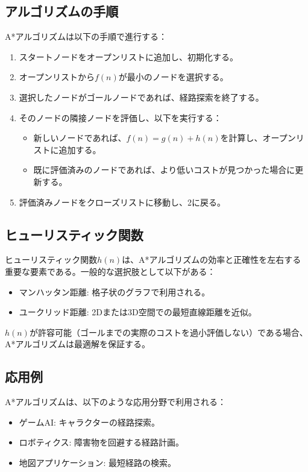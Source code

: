 \subsection*{アルゴリズムの手順}
A*アルゴリズムは以下の手順で進行する：
\begin{enumerate}
    \item スタートノードをオープンリストに追加し、初期化する。
    \item オープンリストから$f(n)$が最小のノードを選択する。
    \item 選択したノードがゴールノードであれば、経路探索を終了する。
    \item そのノードの隣接ノードを評価し、以下を実行する：
    \begin{itemize}
        \item 新しいノードであれば、$f(n) = g(n) + h(n)$を計算し、オープンリストに追加する。
        \item 既に評価済みのノードであれば、より低いコストが見つかった場合に更新する。
    \end{itemize}
    \item 評価済みノードをクローズリストに移動し、2に戻る。
\end{enumerate}

\subsection*{ヒューリスティック関数}
ヒューリスティック関数$h(n)$は、A*アルゴリズムの効率と正確性を左右する重要な要素である。一般的な選択肢として以下がある：
\begin{itemize}
    \item マンハッタン距離: 格子状のグラフで利用される。
    \item ユークリッド距離: 2Dまたは3D空間での最短直線距離を近似。
\end{itemize}
$h(n)$が許容可能（ゴールまでの実際のコストを過小評価しない）である場合、A*アルゴリズムは最適解を保証する。

\subsection*{応用例}
A*アルゴリズムは、以下のような応用分野で利用される：
\begin{itemize}
    \item ゲームAI: キャラクターの経路探索。
    \item ロボティクス: 障害物を回避する経路計画。
    \item 地図アプリケーション: 最短経路の検索。
\end{itemize}




